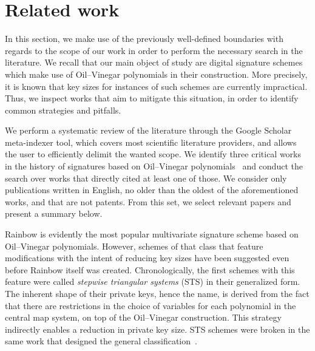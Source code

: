 \documentclass[draft, 12pt, a4paper, oneside]{memoir}
\begin{document}

\section{Related work}\label{sec:related}

In this section, we make use of the previously well-defined boundaries with regards to the scope of our work in order to perform the necessary search in the literature. We recall that our main object of study are digital signature schemes which make use of Oil--Vinegar polynomials in their construction. More precisely, it is known that key sizes for instances of such schemes are currently impractical. Thus, we inspect works that aim to mitigate this situation, in order to identify common strategies and pitfalls.

We perform a systematic review of the literature through the Google Scholar meta-indexer tool, which covers most scientific literature providers, and allows the user to efficiently delimit the wanted scope. We identify three critical works in the history of signatures based on Oil--Vinegar polynomials~\cite{Patarin:199709,Kipnis:199904,Ding:200506} and conduct the search over works that directly cited at least one of those. We consider only publications written in English, no older than the oldest of the aforementioned works, and that are not patents. From this set, we select relevant papers and present a summary below.

Rainbow is evidently the most popular multivariate signature scheme based on Oil--Vinegar polynomials. However, schemes of that class that feature modifications with the intent of reducing key sizes have been suggested even before Rainbow itself was created. Chronologically, the first schemes with this feature were called \emph{stepwise triangular systems} (STS) in their generalized form. The inherent shape of their private keys, hence the name, is derived from the fact that there are restrictions in the choice of variables for each polynomial in the central map system, on top of the Oil--Vinegar construction. This strategy indirectly enables a reduction in private key size. STS schemes were broken in the same work that designed the general classification~\cite{}.
\end{document}
